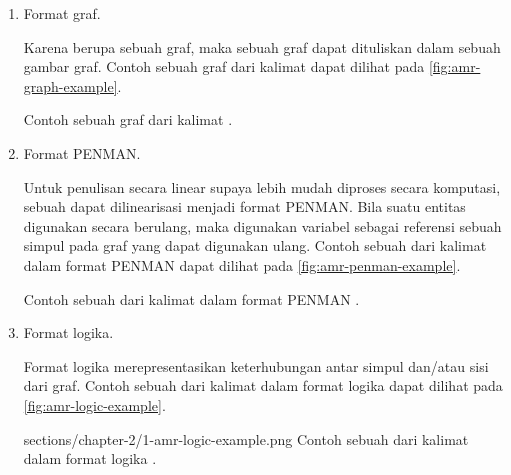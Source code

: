 \begin{enumerate}
  \item Format graf.

  Karena \AMR{} berupa sebuah graf, maka sebuah graf \AMR{} dapat dituliskan dalam sebuah gambar graf.
  Contoh sebuah graf \AMR{} dari kalimat  dapat dilihat pada \cref{fig:amr-graph-example}.

    {Contoh sebuah graf \AMR{} dari kalimat  .}

  \item Format PENMAN.

  Untuk penulisan secara linear supaya lebih mudah diproses secara komputasi, sebuah \AMR{} dapat dilinearisasi menjadi format PENMAN.
  Bila suatu entitas digunakan secara berulang, maka digunakan variabel sebagai referensi sebuah simpul pada graf yang dapat digunakan ulang.
  Contoh sebuah \AMR{} dari kalimat  dalam format PENMAN dapat dilihat pada \cref{fig:amr-penman-example}.

    {Contoh sebuah \AMR{} dari kalimat  dalam format PENMAN .}

  \item Format logika.

  Format logika merepresentasikan keterhubungan antar simpul dan/atau sisi dari graf.
  Contoh sebuah \AMR{} dari kalimat  dalam format logika dapat dilihat pada \cref{fig:amr-logic-example}.

    {sections/chapter-2/1-amr-logic-example.png}
    {Contoh sebuah \AMR{} dari kalimat  dalam format logika .}
\end{enumerate}
